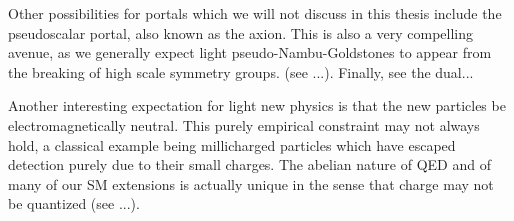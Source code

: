 Other possibilities for portals which we will not discuss in this thesis include the pseudoscalar portal, also known as the axion. This is also a very compelling avenue, as we generally expect light pseudo-Nambu-Goldstones to appear from the breaking of high scale symmetry groups. (see ...). Finally, see the dual...

Another interesting expectation for light new physics is that the new particles be electromagnetically neutral. This purely empirical constraint may not always hold, a classical example being millicharged particles which have escaped detection purely due to their small charges. The abelian nature of QED and of many of our SM extensions is actually unique in the sense that charge may not be quantized (see \eg ...).
